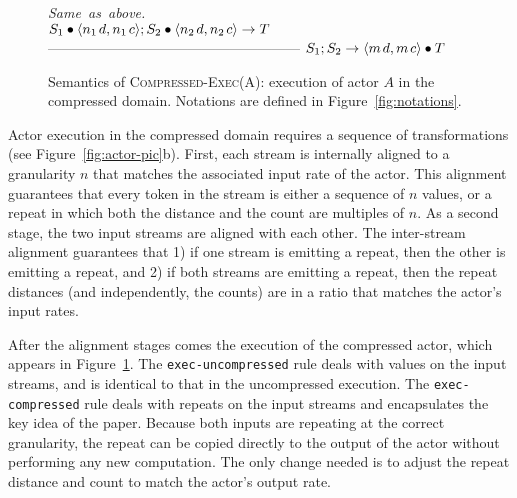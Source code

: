 \begin{figure}[t]
\hfill\mbox{\it Same as above.}\vspace{6pt}\\
$S_1 \bullet \langle n_1{\hspace{1.3pt}}d, n_1{\hspace{1.3pt}}c\rangle;S_2 \bullet \langle n_2{\hspace{1.3pt}}d, n_2{\hspace{1.3pt}}c\rangle \rightarrow T$ \skiptopb
------------------------------------------------------ \skipbot
$S_1; S_2 \rightarrow \langle m{\hspace{1.3pt}}d, m{\hspace{1.3pt}}c\rangle \bullet T$
\caption{Semantics of \textsc{Compressed-Exec(A)}: execution of actor
$A$ in the compressed domain.
Notations are defined in Figure~\ref{fig:notations}.
\protect\label{fig:compressed-exec-rule}}
\end{figure}

Actor execution in the compressed domain requires a sequence of
transformations (see Figure~\ref{fig:actor-pic}b).  First, each stream
is internally aligned to a granularity $n$ that matches the associated
input rate of the actor.  This alignment guarantees that every token
in the stream is either a sequence of $n$ values, or a repeat in which
both the distance and the count are multiples of $n$.  As a second
stage, the two input streams are aligned with each other.  The
inter-stream alignment guarantees that 1) if one stream is emitting a
repeat, then the other is emitting a repeat, and 2) if both streams
are emitting a repeat, then the repeat distances (and independently,
the counts) are in a ratio that matches the actor's input rates.

After the alignment stages comes the execution of the compressed
actor, which appears in Figure~\ref{fig:compressed-exec-rule}.  The
{\tt exec-uncompressed} rule
deals with values on the input streams, and is identical to that in
the uncompressed execution.  The {\tt exec-compressed} rule deals with
repeats on the input streams and encapsulates the key idea of the
paper.  Because both inputs are repeating at the correct granularity,
the repeat can be copied directly to the output of the actor without
performing any new computation.  The only change needed is to adjust
the repeat distance and count to match the actor's output rate.

